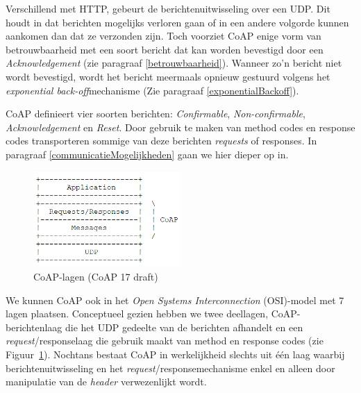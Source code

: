 Verschillend met HTTP, gebeurt de berichtenuitwisseling over een UDP. Dit houdt in dat berichten mogelijks verloren gaan of in een andere volgorde kunnen aankomen dan dat ze verzonden zijn. Toch voorziet CoAP enige vorm van betrouwbaarheid met een soort bericht dat kan worden bevestigd door een \textit{Acknowledgement} (zie paragraaf \ref{betrouwbaarheid}). Wanneer zo'n bericht niet wordt bevestigd, wordt het bericht meermaals opnieuw gestuurd volgens het \textit{exponential back-off}mechanisme (Zie paragraaf \ref{exponentialBackoff}).

CoAP definieert vier soorten berichten: \textit{Confirmable}, \textit{Non-confirmable}, \textit{Acknowledgement} en \textit{Reset}. Door gebruik te maken van method codes en response codes transporteren sommige van deze berichten \textit{requests} of responses. In paragraaf \ref{communicatieMogelijkheden} gaan we hier dieper op in.\\

\begin{figure}
\vspace{-10pt}
\includegraphics[width=0.5\textwidth]{fig/CoAPLaag}
\vspace{-30pt}
\caption{CoAP-lagen (CoAP 17 draft)}
\vspace{-5pt}
\label{fig:CoAPLaag}
\end{figure}
We kunnen CoAP ook in het \textit{Open Systems Interconnection} (OSI)-model  met 7 lagen plaatsen. Conceptueel gezien hebben we twee deellagen, CoAP-berichtenlaag die het UDP gedeelte van de berichten afhandelt en een \textit{request}/responselaag die gebruik maakt van method en response codes (zie Figuur~\ref{fig:CoAPLaag}). Nochtans bestaat CoAP in werkelijkheid slechts uit \'{e}\'{e}n laag waarbij berichtenuitwisseling en het \textit{request}/responsemechanisme enkel en alleen door manipulatie van de \textit{header} verwezenlijkt wordt.

\newpage
